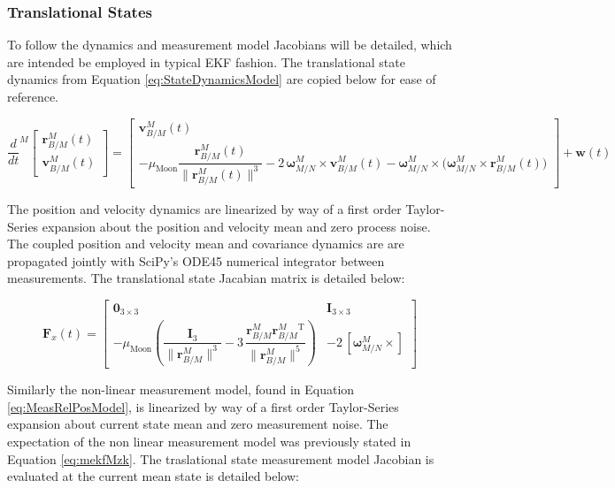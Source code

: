 \documentclass[conf]{new-aiaa}
\newcommand{\vect}[1]{\mathbf{#1}}
\newcommand{\mat}[1]{\mathbf{#1}}
\newcommand{\rBM}{\vect{r}^M_{B/M}}      %
\newcommand{\vBM}{\vect{v}^M_{B/M}}      %
\newcommand{\wMN}{\vect{\omega}^M_{M/N}}
\begin{document}
\subsubsection{Translational States}
To follow the dynamics and measurement model Jacobians will be detailed, which are intended be employed in typical EKF fashion.
The translational state dynamics from Equation \ref{eq:StateDynamicsModel} are copied below for ease of reference.

\begin{equation}
\frac{d}{dt}^M
\begin{bmatrix}
\rBM(t) \\[6pt]
\vBM(t)
\end{bmatrix}
=
\begin{bmatrix}
\vBM(t) \\[6pt]
-\mu_{\mathrm{Moon}} \dfrac{\rBM(t)}{\|\rBM(t)\|^3}
- 2\,\wMN \times \vBM(t)
- \wMN \times \!\big( \wMN \times \rBM(t) \big)
\end{bmatrix}
+ \vect{w}(t)
\label{eq:trans_dynamics}
\end{equation}



The position and velocity dynamics are linearized by way of a first order Taylor-Series expansion about the position and velocity mean and zero process noise. The coupled position and velocity mean and covariance dynamics are are propagated jointly with SciPy's ODE45 numerical integrator between measurements. The translational state Jacabian matrix is detailed below:

\begin{equation}
\mat{F}_x(t) =
\begin{bmatrix}
\vect{0}_{3\times3} & \mat{I}_{3\times3} \\[8pt]
-\mu_{\mathrm{Moon}}
\!\left(
\dfrac{\mat{I}_{3}}{\|\rBM\|^{3}}
- 3\,\dfrac{\rBM\rBM^{\mathrm{T}}}{\|\rBM\|^{5}}
\right)
& -2\,\left[\wMN\times\right]
\end{bmatrix}
\label{eq:StateJacobianFx}
\end{equation}

 
Similarly the non-linear measurement model, found in Equation \ref{eq:MeasRelPosModel}, is linearized by way of a first order Taylor-Series expansion about current state mean and zero measurement noise. The expectation of the non linear measurement model was previously stated in Equation \ref{eq:mekfMzk}.  The traslational state measurement model Jacobian is evaluated at the current mean state is detailed below:
\end{document}
